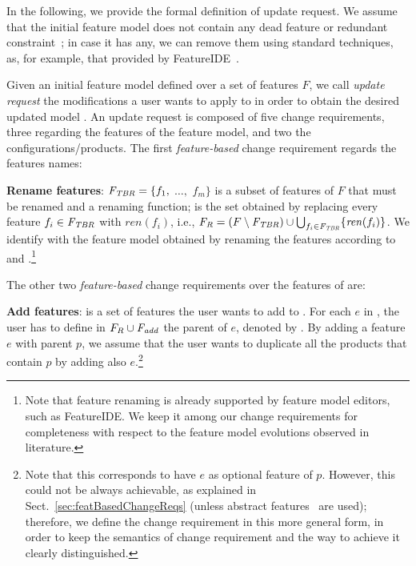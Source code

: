 \begin{tikzborder}{\cite{Gargantini16:validation}}
\begin{tikzborder}{\cite{gargantini_combinatorial_2017}}
\begin{tikzborder}{\cite{garn2019}}
\begin{tikzborder}{\cite{arcaini2019achieving}}
\begin{compactitem}
	\end{compactitem}
	
	In the following, we provide the formal definition of update request. We assume that the initial feature model does not contain any dead feature or redundant constraint~\cite{benavides2010automated,Duran2017FLAME}; in case it has any, we can remove them using standard techniques, as, for example, that provided by FeatureIDE~\cite{FeatureIDEbook}.
	
	\begin{mydef}\label{def:fic1}
		Given an initial feature model \initFm defined over a set of features $F$, we call \emph{update request} \UR the modifications a user wants to apply to \initFm in order to obtain the desired updated model \fmp. An update request is composed of five change requirements, three regarding the features of the feature model, and two the configurations/products. The first \emph{feature-based} change requirement regards the features names:
		\begin{compactitem}
			\item {\bf Rename features}: $\mathit{F_{TBR}} = \{f_1,$ $\ldots,$ $f_m\}$ is a subset of features of $F$ that must be renamed and \rename a renaming function; \renamedFeatures is the set obtained by replacing every feature $f_i \in \mathit{F_{TBR}}$ with $\mathit{ren}(f_i)$, i.e., $\mathit{F_R} = (F \setminus \mathit{F_{TBR}}) \cup \bigcup_{f_i \in \mathit{F_{TBR}}} \{\mathit{ren}(f_i)\}$. We identify with \fmrenamed the feature model obtained by renaming the features according to \Ftbr and \rename.\footnote{Note that feature renaming is already supported by feature model editors, such as FeatureIDE. We keep it among our change requirements for completeness with respect to the feature model evolutions observed in literature.}
		\end{compactitem}
		The other two \emph{feature-based} change requirements over the features of \fmrenamed are:
		\begin{compactitem}
			\item {\bf Add features}: \Fadd is a set of features the user wants to add to \fmrenamed. For each $e$ in \Fadd, the user has to define in $F_R \cup \mathit{F_{add}}$ the parent of $e$, denoted by . By adding a feature $e$ with parent $p$, we assume that the user wants to duplicate all the products that contain $p$ by adding also $e$.\footnote{Note that this corresponds to have $e$ as optional feature of $p$. However, this could not be always achievable, as explained in Sect.~\ref{sec:featBasedChangeReqs} (unless abstract features~\cite{thum_abstract_2011} are used); therefore, we define the change requirement in this more general form, in order to keep the semantics of change requirement and the way to achieve it clearly distinguished.} 

\end{compactitem}
\end{mydef}
\end{tikzborder}
\end{tikzborder}
\end{tikzborder}
\end{tikzborder}
